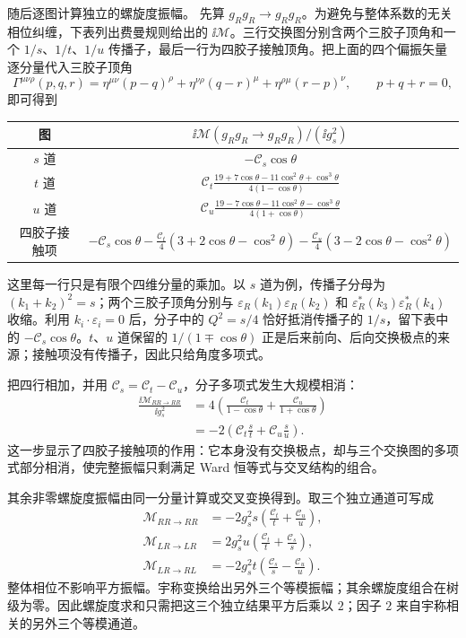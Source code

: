 \begin{derivation}[胶子散射的颜色与偏振求和]
随后逐图计算独立的螺旋度振幅。
先算 $g_Rg_R\to g_Rg_R$。为避免与整体系数的无关相位纠缠，下表列出费曼规则给出的 $\ii\mathcal M$。三行交换图分别含两个三胶子顶角和一个 $1/s$、$1/t$、$1/u$ 传播子，最后一行为四胶子接触顶角。把上面的四个偏振矢量逐分量代入三胶子顶角
\begin{equation*}
 \Gamma^{\mu\nu\rho}(p,q,r)
 =\eta^{\mu\nu}(p-q)^\rho
 +\eta^{\nu\rho}(q-r)^\mu
 +\eta^{\rho\mu}(r-p)^\nu,
 \qquad p+q+r=0,
\end{equation*}
即可得到
\begin{center}
\begin{tabular}{c|c}
图 & $\ii\mathcal M(g_Rg_R\to g_Rg_R)/(\ii g_s^2)$\\ \hline
$s$ 道 & $-\mathcal C_s\cos\theta$\\[2pt]
$t$ 道 & $\displaystyle
 \mathcal C_t\frac{19+7\cos\theta-11\cos^2\theta+\cos^3\theta}
 {4(1-\cos\theta)}$\\[8pt]
$u$ 道 & $\displaystyle
 \mathcal C_u\frac{19-7\cos\theta-11\cos^2\theta-\cos^3\theta}
 {4(1+\cos\theta)}$\\[8pt]
四胶子接触项 & $\displaystyle
 -\mathcal C_s\cos\theta
 -\frac{\mathcal C_t}{4}(3+2\cos\theta-\cos^2\theta)
 -\frac{\mathcal C_u}{4}(3-2\cos\theta-\cos^2\theta)$
\end{tabular}
\end{center}
这里每一行只是有限个四维分量的乘加。以 $s$ 道为例，传播子分母为 $(k_1+k_2)^2=s$；两个三胶子顶角分别与
$\varepsilon_R(k_1)\varepsilon_R(k_2)$ 和
$\varepsilon_R^*(k_3)\varepsilon_R^*(k_4)$ 收缩。利用
$k_i\cdot\varepsilon_i=0$ 后，分子中的 $Q^2=s/4$ 恰好抵消传播子的 $1/s$，留下表中的 $-\mathcal C_s\cos\theta$。$t$、$u$ 道保留的 $1/(1\mp\cos\theta)$ 正是后来前向、后向交换极点的来源；接触项没有传播子，因此只给角度多项式。

把四行相加，并用 $\mathcal C_s=\mathcal C_t-\mathcal C_u$，分子多项式发生大规模相消：
\begin{align*}
 \frac{\ii\mathcal M_{RR\to RR}}{\ii g_s^2}
 &=4\left(
 \frac{\mathcal C_t}{1-\cos\theta}
 +\frac{\mathcal C_u}{1+\cos\theta}
 \right)\\
 &=-2\left(
 \mathcal C_t\frac{s}{t}
 +\mathcal C_u\frac{s}{u}
 \right).
\end{align*}
这一步显示了四胶子接触项的作用：它本身没有交换极点，却与三个交换图的多项式部分相消，使完整振幅只剩满足 Ward 恒等式与交叉结构的组合。

其余非零螺旋度振幅由同一分量计算或交叉变换得到。取三个独立通道可写成
\begin{align*}
 \mathcal M_{RR\to RR}
 &=-2g_s^2s\left(\frac{\mathcal C_t}{t}+\frac{\mathcal C_u}{u}\right),\\
 \mathcal M_{LR\to LR}
 &=2g_s^2u\left(\frac{\mathcal C_t}{t}+\frac{\mathcal C_s}{s}\right),\\
 \mathcal M_{LR\to RL}
 &=-2g_s^2t\left(\frac{\mathcal C_s}{s}-\frac{\mathcal C_u}{u}\right).
\end{align*}
整体相位不影响平方振幅。宇称变换给出另外三个等模振幅；其余螺旋度组合在树级为零。因此螺旋度求和只需把这三个独立结果平方后乘以 $2$；因子 $2$ 来自宇称相关的另外三个等模通道。


\end{derivation}
